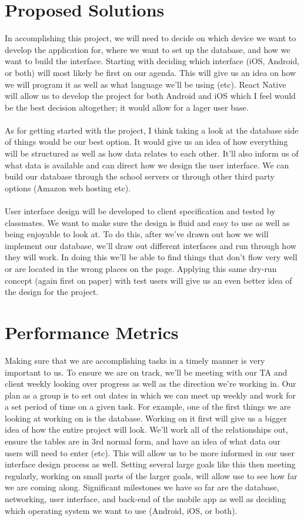 \documentclass[letterpaper, 10, draftclsnofoot,onecolumn]{IEEEtran}
\begin{document}
\section*{Proposed Solutions} In accomplishing this project, we will need to decide on which device we want to develop the application for, where we want to set up the database, and how we want to build the interface. Starting with deciding which interface (iOS, Android, or both) will most likely be first on our agenda. This will give us an idea on how we will program it as well as what language we'll be using (etc). React Native will allow us to develop the project for both Android and iOS which I feel would be the best decision altogether; it would allow for a lager user base.
\\ \\
\indent As for getting started with the project, I think taking a look at the database side of things would be our best option. It would give us an idea of how everything will be structured as well as how data relates to each other. It'll also inform us of what data is available and can direct how we design the user interface. We can build our database through the school servers or through other third party options (Amazon web hosting etc).
\\ \\
\indent User interface design will be developed to client specification and tested by classmates. We want to make sure the design is fluid and easy to use as well as being enjoyable to look at. To do this, after we've drawn out how we will implement our database, we'll draw out different interfaces and run through how they will work. In doing this we'll be able to find things that don't flow very well or are located in the wrong places on the page. Applying this same dry-run concept (again first on paper) with test users will give us an even better idea of the design for the project.   
\section*{Performance Metrics} Making sure that we are accomplishing tasks in a timely manner is very important to us. To ensure we are on track, we'll be meeting with our TA and client weekly looking over progress as well as the direction we're working in. Our plan as a group is to set out dates in which we can meet up weekly and work for a set period of time on a given task. For example, one of the first things we are looking at working on is the database. Working on it first will give us a bigger idea of how the entire project will look. We'll work all of the relationships out, ensure the tables are in 3rd normal form, and have an idea of what data our users will need to enter (etc). This will allow us to be more informed in our user interface design process as well. Setting several large goals like this then meeting regularly, working on small parts of the larger goals, will allow use to see how far we are coming along. Significant milestones we have so far are the database, networking, user interface, and back-end of the mobile app as well as deciding which operating system we want to use (Android, iOS, or both).
\end{document}
